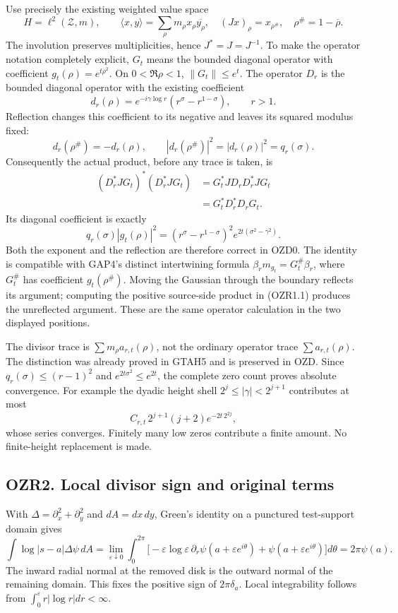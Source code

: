 Use precisely the existing weighted value space \[
H=\ell^2(\mathscr Z,m),\qquad
\langle x,y\rangle=\sum_\rho m_\rho x_\rho\overline{y_\rho},
\quad (Jx)_\rho=x_{\rho^\#},\quad \rho^\#=1-\overline\rho.
\] The involution preserves multiplicities, hence \(J^*=J=J^{-1}\). To
make the operator notation completely explicit, \(G_t\) means the
bounded diagonal operator with coefficient \(g_t(\rho)=e^{t\rho^2}\). On
\(0<\Re\rho<1\), \(\|G_t\|\le e^t\). The operator \(D_r\) is the bounded
diagonal operator with the existing coefficient \[
d_r(\rho)=e^{-i\gamma\log r}(r^\sigma-r^{1-\sigma}),\qquad r>1.
\] Reflection changes this coefficient to its negative and leaves its
squared modulus fixed: \[
d_r(\rho^\#)=-d_r(\rho),\qquad
|d_r(\rho^\#)|^2=|d_r(\rho)|^2=q_r(\sigma).
\] Consequently the actual product, before any trace is taken, is \[
\begin{aligned}
(D_r^*JG_t)^*(D_r^*JG_t)
&=G_t^*JD_rD_r^*JG_t\\
&=G_t^*D_r^*D_rG_t.
\end{aligned}
\tag{OZR1.1}
\] Its diagonal coefficient is exactly \[
q_r(\sigma)|g_t(\rho)|^2
=(r^\sigma-r^{1-\sigma})^2e^{2t(\sigma^2-\gamma^2)}.
\tag{OZR1.2}
\] Both the exponent and the reflection are therefore correct in OZD0.
The identity is compatible with GAP4's distinct intertwining formula
\(\beta_rm_{g_t}=G_t^\#\beta_r\), where \(G_t^\#\) has coefficient
\(g_t(\rho^\#)\). Moving the Gaussian through the boundary reflects its
argument; computing the positive source-side product in (OZR1.1)
produces the unreflected argument. These are the same operator
calculation in the two displayed positions.

The divisor trace is \(\sum m_\rho a_{r,t}(\rho)\), not the ordinary
operator trace \(\sum a_{r,t}(\rho)\). The distinction was already
proved in GTAH5 and is preserved in OZD. Since \(q_r(\sigma)\le(r-1)^2\)
and \(e^{2t\sigma^2}\le e^{2t}\), the complete zero count proves
absolute convergence. For example the dyadic height shell
\(2^j\le|\gamma|<2^{j+1}\) contributes at most \[
C_{r,t}\,2^{j+1}(j+2)e^{-2t\,2^{2j}},
\] whose series converges. Finitely many low zeros contribute a finite
amount. No finite-height replacement is made.

\subsection{OZR2. Local divisor sign and original
terms}\label{ozr2.-local-divisor-sign-and-original-terms}

With \(\Delta=\partial_x^2+\partial_y^2\) and \(dA=dx\,dy\), Green's
identity on a punctured test-support domain gives \[
\int \log|s-a|\Delta\psi\,dA
=\lim_{\varepsilon\downarrow0}\int_0^{2\pi}
\bigl[-\varepsilon\log\varepsilon\,\partial_r\psi(a+\varepsilon e^{i\theta})
+\psi(a+\varepsilon e^{i\theta})\bigr]d\theta
=2\pi\psi(a).
\tag{OZR2.1}
\] The inward radial normal at the removed disk is the outward normal of
the remaining domain. This fixes the positive sign of \(2\pi\delta_a\).
Local integrability follows from
\(\int_0^\varepsilon r|\log r|dr<\infty\).

